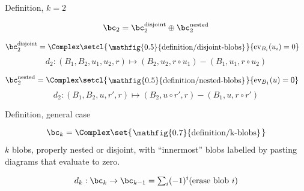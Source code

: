 \documentclass[beamer, compress]{beamer}
\begin{document}
\begin{frame}{Definition, $k=2$}
\begin{block}{}
\vspace{-1mm}
$$\bc_2 = \bc_2^{\text{disjoint}} \oplus \bc_2^{\text{nested}}$$
\end{block}
\begin{block}{}
\vspace{-5mm}
\begin{align*}
\bc_2^{\text{disjoint}} & =  \Complex\setcl{\roundframe{\mathfig{0.5}{definition/disjoint-blobs}}}{\text{ev}_{B_i}(u_i) = 0}
\end{align*}
\vspace{-4mm}
$$d_2 : (B_1, B_2, u_1, u_2, r) \mapsto (B_2, u_2, r \circ u_1) - (B_1, u_1, r \circ u_2)$$
\end{block}
\begin{block}{}
\vspace{-5mm}
\begin{align*}
\bc_2^{\text{nested}} & = \Complex\setcl{\roundframe{\mathfig{0.5}{definition/nested-blobs}}}{\text{ev}_{B_1}(u)=0}
\end{align*}
\vspace{-4mm}
$$d_2 : (B_1, B_2, u, r', r) \mapsto (B_2, u \circ r', r) - (B_1, u, r \circ r')$$
\end{block}
\end{frame}

\begin{frame}{Definition, general case}
\begin{block}{}
$$\bc_k = \Complex\set{\roundframe{\mathfig{0.7}{definition/k-blobs}}}$$
$k$ blobs, properly nested or disjoint, with ``innermost'' blobs labelled by pasting diagrams that evaluate to zero.
\end{block}
\begin{block}{}
\vspace{-2mm}
$$d_k : \bc_k \to \bc_{k-1} = {\textstyle \sum_i} (-1)^i (\text{erase blob $i$})$$
\end{block}
\end{frame}
\end{document}
